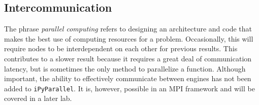 \subsection*{Intercommunication}
The phrase \emph{parallel computing} refers to designing an architecture and code that makes the best use of computing resources for a problem.
Occasionally, this will require nodes to be interdependent on each other for previous results.
This contributes to a slower result because it requires a great deal of communication latency, but is sometimes the only method to parallelize a function.
Although important, the ability to effectively communicate between engines has not been added to \texttt{iPyParallel}.
It is, however, possible in an MPI framework and will be covered in a later lab.

%
%
%
%
%
